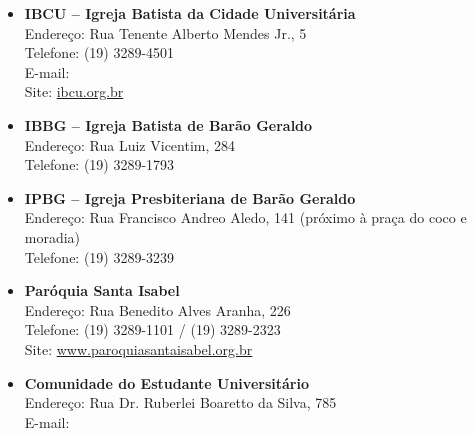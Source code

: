 \begin{itemize}
    \item   \textbf{IBCU -- Igreja Batista da Cidade Universitária}
        \\Endereço: Rua Tenente Alberto Mendes Jr., 5
        \\Telefone: (19) 3289-4501
        \\E-mail: 
        \\Site: \url{ibcu.org.br}

    \item   \textbf{IBBG -- Igreja Batista de Barão Geraldo}
        \\Endereço: Rua Luiz Vicentim, 284
        \\Telefone: (19) 3289-1793

    \item   \textbf{IPBG -- Igreja Presbiteriana de Barão Geraldo}
        \\Endereço: Rua Francisco Andreo Aledo, 141 (próximo à praça do coco e moradia)
        \\Telefone: (19) 3289-3239



    \item   \textbf{Paróquia Santa Isabel}
        \\Endereço: Rua Benedito Alves Aranha, 226
        \\Telefone: (19) 3289-1101 / (19) 3289-2323
        \\Site: \url{www.paroquiasantaisabel.org.br}

    \item   \textbf{Comunidade do Estudante Universitário}
        \\Endereço: Rua Dr. Ruberlei Boaretto da Silva, 785
        \\E-mail: 
\end{itemize}


